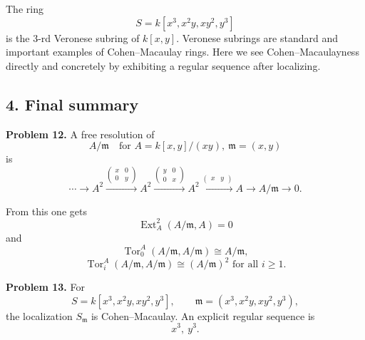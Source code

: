 \documentclass[12pt,a4paper]{article}
\theoremstyle{notespace}
\DeclareMathOperator{\Tor}{Tor}
\DeclareMathOperator{\Ext}{Ext}
\begin{document}
The ring
\[
S=k[x^3,x^2y,xy^2,y^3]
\]
is the \(3\)-rd Veronese subring of \(k[x,y]\). Veronese subrings are standard and important examples of Cohen--Macaulay rings. Here we see Cohen--Macaulayness directly and concretely by exhibiting a regular sequence after localizing.

\subsection{4. Final summary}

\textbf{Problem 12.}
A free resolution of
\[
A/\mathfrak m
\quad\text{for } A=k[x,y]/(xy),\ \mathfrak m=(x,y)
\]
is
\[
\cdots
\longrightarrow A^2
\xrightarrow{\begin{pmatrix}x&0\\0&y\end{pmatrix}}
A^2
\xrightarrow{\begin{pmatrix}y&0\\0&x\end{pmatrix}}
A^2
\xrightarrow{\begin{pmatrix}x&y\end{pmatrix}}
A
\longrightarrow A/\mathfrak m
\longrightarrow 0.
\]

From this one gets
\[
\boxed{\Ext_A^2(A/\mathfrak m,A)=0}
\]
and
\[
\boxed{\Tor_0^A(A/\mathfrak m,A/\mathfrak m)\cong A/\mathfrak m,}
\]
\[
\boxed{\Tor_i^A(A/\mathfrak m,A/\mathfrak m)\cong (A/\mathfrak m)^2 \text{ for all } i\ge 1.}
\]

\medskip

\textbf{Problem 13.}
For
\[
S=k[x^3,x^2y,xy^2,y^3],
\qquad
\mathfrak m=(x^3,x^2y,xy^2,y^3),
\]
the localization \(S_{\mathfrak m}\) is Cohen--Macaulay. An explicit regular sequence is
\[
\boxed{x^3,\ y^3.}
\]
	
\end{document}
